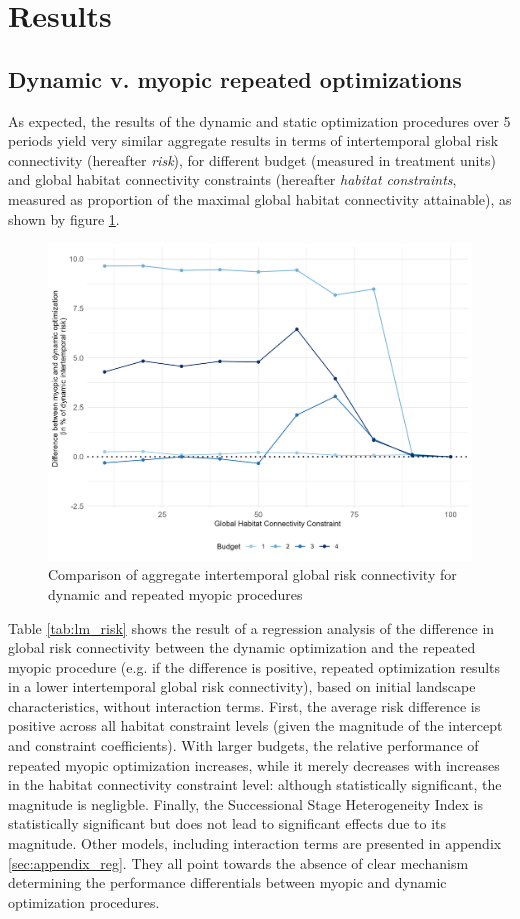 \section{Results}

\subsection{Dynamic v. myopic repeated optimizations}

As expected, the results of the dynamic and static optimization procedures over 5 periods yield very similar aggregate results in terms of intertemporal global risk connectivity (hereafter \textit {risk}), for different budget (measured in treatment units) and global habitat connectivity constraints (hereafter \textit{habitat constraints}, measured as proportion of the maximal global habitat connectivity attainable), as shown by figure \ref{fig:risk_diff}.

\begin{figure}
    \centering
    \includegraphics[width = .8\linewidth]{figures/wildland/aggregate_risk_diff.jpg}
    \caption{Comparison of aggregate intertemporal global risk connectivity for dynamic and repeated myopic procedures}
    \label{fig:risk_diff}
\end{figure}
 
Table \ref{tab:lm_risk} shows the result of a regression analysis of the difference in global risk connectivity between the dynamic optimization and the repeated myopic procedure (e.g. if the difference is positive, repeated optimization results in a lower intertemporal global risk connectivity), based on initial landscape characteristics, without interaction terms. First, the average risk difference is positive across all habitat constraint levels (given the magnitude of the intercept and constraint coefficients). With larger budgets, the relative performance of repeated myopic optimization increases, while it merely decreases with increases in the habitat connectivity constraint level: although statistically significant, the magnitude is negligble. Finally, the Successional Stage Heterogeneity Index is statistically significant but does not lead to significant effects due to its magnitude. Other models, including interaction terms are presented in appendix \ref{sec:appendix_reg}. They all point towards the absence of clear mechanism determining the performance differentials between myopic and dynamic optimization procedures.


